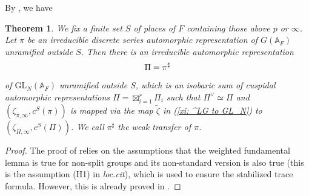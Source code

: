 \documentclass[12pt,oneside,reqno]{amsart}
\theoremstyle{plain}
\newtheorem{theorem}{Theorem}[section]
\begin{document}
	
	
	
	
	By \cite[Corollary 2.5.3]{Shin2024}, we have
	\begin{theorem}\label{weak transfer pi to Pi}
		We fix a finite set $S$ of places of $F$ containing those above $p$ or $\infty$.
		Let $\pi$ be an irreducible discrete series automorphic representation of $G(\mathbb{A}_F)$ unramified outside $S$. Then there is an irreducible automorphic representation
		\begin{equation}\label{Arthur parameter}
			\Pi=\pi^\sharp\index{p@$\pi^\sharp$}
		\end{equation}
		of $\mathrm{GL}_N(\mathbb{A}_F)$ unramified outside $S$, which is an isobaric sum of cuspidal automorphic representations $\Pi=\boxtimes_{i=1}^r\Pi_i$ such that $\Pi^\vee\simeq\Pi$ and $(\zeta_{\pi,\infty},c^S(\pi))$ is mapped via the map $\widetilde{\zeta}$ in (\ref{xi: ^LG to GL_N}) to $(\zeta_{\Pi,\infty},c^S(\Pi))$. We call $\pi^\sharp$ the \emph{weak transfer} of $\pi$.
	\end{theorem}
	\begin{proof}
		The proof of \cite[Corollary 2.5.3]{Shin2024} relies on the assumptions that the weighted fundamental lemma is true for non-split groups and its non-standard version is also true (this is the assumption (H1) in \emph{loc.cit}), which is used to ensure the stabilized trace formula. However, this is already proved in \cite{Arthur2001,Arthur2002,Arthur2003}.
	\end{proof}
	
	
	
\end{document}

